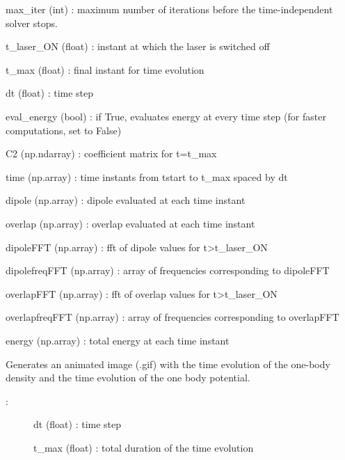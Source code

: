\documentclass[letterpaper,10pt,english]{sphinxmanual}
\begin{document}
\begin{fulllineitems}
\begin{fulllineitems}
\begin{description}
max\_iter (int) : maximum number of iterations before the time-independent solver stops.

t\_laser\_ON (float) : instant at which the laser is switched off

t\_max (float) : final instant for time evolution

dt (float) : time step

eval\_energy (bool) : if True, evaluates energy at every time step (for faster computations, set to False)

\item[{\sphinxstylestrong{Returns}:}] \leavevmode
C2 (np.ndarray) : coefficient matrix for t=t\_max

time (np.array) : time instants from tstart to t\_max spaced by dt

dipole (np.array) : dipole evaluated at each time instant

overlap (np.array) : overlap evaluated at each time instant

dipoleFFT (np.array) : fft of dipole values for t\textgreater{}t\_laser\_ON

dipolefreqFFT (np.array) : array of frequencies corresponding to dipoleFFT

overlapFFT (np.array) : fft of overlap values for t\textgreater{}t\_laser\_ON

overlapfreqFFT (np.array) : array of frequencies corresponding to overlapFFT

energy (np.array) : total energy at each time instant

\end{description}

\end{fulllineitems}


\begin{fulllineitems}
\label{\detokenize{index:do.GHF.gif_generator}}
Generates an animated image (.gif) with the time evolution of the one-body density and the time evolution of the one body potential.
\begin{description}
\item[{:}] \leavevmode
dt (float) : time step

t\_max (float) : total duration of the time evolution


\end{description}
\end{fulllineitems}
\end{fulllineitems}
\end{document}
